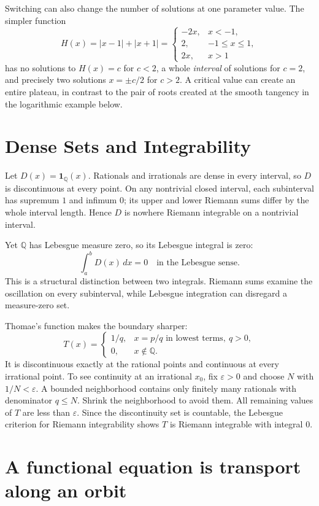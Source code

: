 Switching can also change the number of solutions at one parameter value. The simpler function
\[
 H(x)=|x-1|+|x+1|=
 \begin{cases}
 -2x,&x<-1,\\
 2,&-1\le x\le1,\\
 2x,&x>1
 \end{cases}
\]
has no solutions to $H(x)=c$ for $c<2$, a whole \emph{interval} of solutions for $c=2$, and precisely two solutions $x=\pm c/2$ for $c>2$. A critical value can create an entire plateau, in contrast to the pair of roots created at the smooth tangency in the logarithmic example below.

\section{Dense Sets and Integrability}

Let \(D(x)=\mathbf1_{\mathbb Q}(x)\). Rationals and irrationals are dense in every interval, so \(D\) is discontinuous at every point. On any nontrivial closed interval, each subinterval has supremum \(1\) and infimum \(0\); its upper and lower Riemann sums differ by the whole interval length. Hence \(D\) is nowhere Riemann integrable on a nontrivial interval.

Yet \(\mathbb Q\) has Lebesgue measure zero, so its Lebesgue integral is zero:
\[
 \int_a^bD(x)\,dx=0
 \quad\text{in the Lebesgue sense}.
\]
This is a structural distinction between two integrals. Riemann sums examine the oscillation on every subinterval, while Lebesgue integration can disregard a measure-zero set.

Thomae's function makes the boundary sharper:
\[
 T(x)=
 \begin{cases}
 1/q,&x=p/q\text{ in lowest terms},\ q>0,\\
 0,&x\notin\mathbb Q.
 \end{cases}
\]
It is discontinuous exactly at the rational points and continuous at every irrational point. To see continuity at an irrational \(x_0\), fix \(\varepsilon>0\) and choose \(N\) with \(1/N<\varepsilon\). A bounded neighborhood contains only finitely many rationals with denominator \(q\le N\). Shrink the neighborhood to avoid them. All remaining values of \(T\) are less than \(\varepsilon\). Since the discontinuity set is countable, the Lebesgue criterion for Riemann integrability shows \(T\) is Riemann integrable with integral \(0\).

\section{A functional equation is transport along an orbit}

